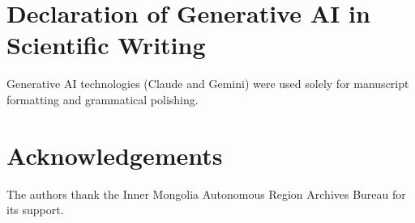 \documentclass[a4paper,fleqn,longmktitle]{cas-sc}
\begin{document}
\section*{Declaration of Generative AI in Scientific Writing}

Generative AI technologies (Claude and Gemini) were used solely for manuscript formatting and grammatical polishing.

\section*{Acknowledgements}

The authors thank the Inner Mongolia Autonomous Region Archives Bureau for its support.

\printcredits



\end{document}
